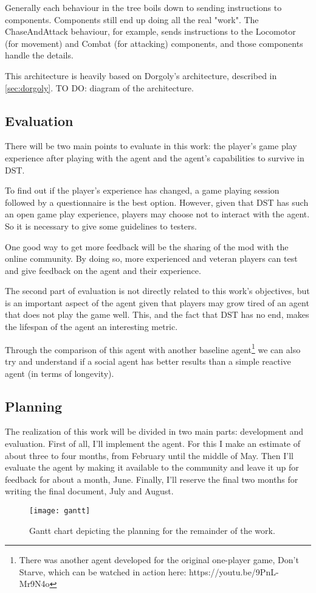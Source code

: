 Generally each behaviour in the tree boils down to sending instructions to components.
Components still end up doing all the real "work".
The ChaseAndAttack behaviour, for example, sends instructions to the Locomotor (for movement) and Combat (for attacking) components, and those components handle the details.

This architecture is heavily based on Dorgoly's architecture, described in \ref{sec:dorgoly}.
TO DO: diagram of the architecture.

\subsection{Evaluation}
There will be two main points to evaluate in this work: the player's game play experience after playing with the agent and the agent's capabilities to survive in \ac{DST}.

To find out if the player's experience has changed, a game playing session followed by a questionnaire is the best option.
However, given that \ac{DST} has such an open game play experience, players may choose not to interact with the agent.
So it is necessary to give some guidelines to testers.

One good way to get more feedback will be the sharing of the mod with the online community.
By doing so, more experienced and veteran players can test and give feedback on the agent and their experience.

The second part of evaluation is not directly related to this work's objectives, but is an important aspect of the agent given that players may grow tired of an agent that does not play the game well.
This, and the fact that \ac{DST} has no end, makes the lifespan of the agent an interesting metric.

Through the comparison of this agent with another baseline agent\footnote{There was another agent developed for the original one-player game, Don't Starve, which can be watched in action here: https://youtu.be/9PnL-Mr9N4o} we can also try and understand if a social agent has better results than a simple reactive agent (in terms of longevity).

\subsection{Planning}
The realization of this work will be divided in two main parts: development and evaluation.
First of all, I'll implement the agent.
For this I make an estimate of about three to four months, from February until the middle of May.
Then I'll evaluate the agent by making it available to the community and leave it up for feedback for about a month, June.
Finally, I'll reserve the final two months for writing the final document, July and August.

\begin{figure}
  \centering
    \texttt{[image: gantt]}
  \caption{Gantt chart depicting the planning for the remainder of the work.}
  \label{fig:gantt}
\end{figure}